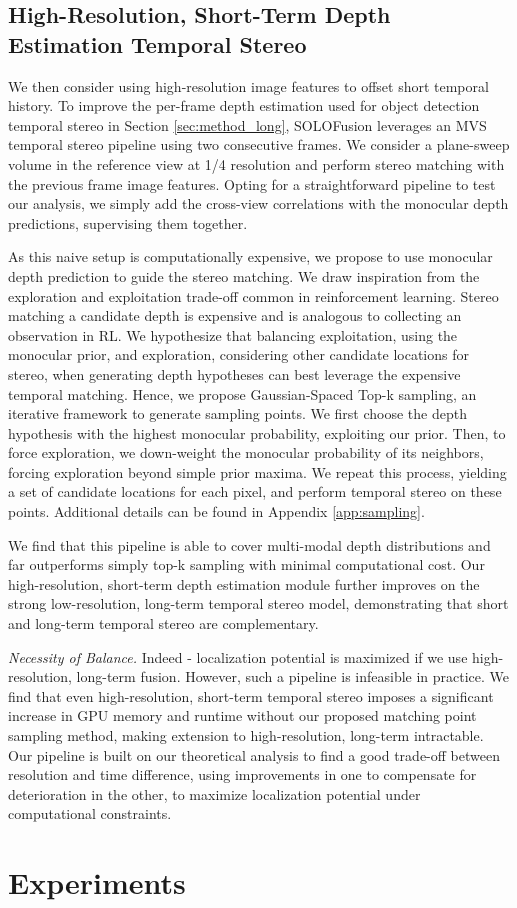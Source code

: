 \documentclass[runningheads, hyperfootnotes=false]{article}
\begin{document}
\subsection{High-Resolution, Short-Term Depth Estimation Temporal Stereo}\label{sec:method_short}
We then consider using high-resolution image features to offset short temporal history. To improve the per-frame depth estimation used for object detection temporal stereo in Section \ref{sec:method_long}, SOLOFusion leverages an MVS temporal stereo pipeline using two consecutive frames. We consider a plane-sweep volume in the reference view at 1/4 resolution and perform stereo matching with the previous frame image features. Opting for a straightforward pipeline to test our analysis, we simply add the cross-view correlations with the monocular depth predictions, supervising them together.

As this naive setup is computationally expensive, we propose to use monocular depth prediction to guide the stereo matching. We draw inspiration from the exploration and exploitation trade-off common in reinforcement learning. Stereo matching a candidate depth is expensive and is analogous to collecting an observation in RL. We hypothesize that balancing exploitation, using the monocular prior, and exploration, considering other candidate locations for stereo, when generating depth hypotheses can best leverage the expensive temporal matching. Hence, we propose Gaussian-Spaced Top-k sampling, an iterative framework to generate sampling points. We first choose the depth hypothesis with the highest monocular probability, exploiting our prior. Then, to force exploration, we down-weight the monocular probability of its neighbors, forcing exploration beyond simple prior maxima. We repeat this process, yielding a set of  candidate locations for each pixel, and perform temporal stereo on these points. Additional details can be found in Appendix \ref{app:sampling}.

We find that this pipeline is able to cover multi-modal depth distributions and far outperforms simply top-k sampling with minimal computational cost. Our high-resolution, short-term depth estimation module further improves on the strong low-resolution, long-term temporal stereo model, demonstrating that short and long-term temporal stereo are complementary.

\noindent\textit{Necessity of Balance.}
Indeed - localization potential is maximized if we use high-resolution, long-term fusion. However, such a pipeline is infeasible in practice. We find that even high-resolution, short-term temporal stereo imposes a significant increase in GPU memory and runtime without our proposed matching point sampling method, making extension to high-resolution, long-term intractable. Our pipeline is built on our theoretical analysis to find a good trade-off between resolution and time difference, using improvements in one to compensate for deterioration in the other, to maximize localization potential under computational constraints.  \section{Experiments}
\end{document}
